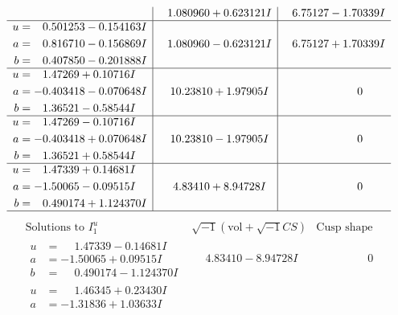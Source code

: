 \documentclass[1p]{elsarticle_modified}
\theoremstyle{definition}
\newcommand{\I}{\sqrt{-1}}
\begin{document}
$$\begin{array}{c|c|c}
 & \phantom{-}1.080960 + 0.623121 I & \phantom{-}6.75127 - 1.70339 I \\ \hline\begin{aligned}
u &= \phantom{-}0.501253 - 0.154163 I \\
a &= \phantom{-}0.816710 - 0.156869 I \\
b &= \phantom{-}0.407850 - 0.201888 I\end{aligned}
 & \phantom{-}1.080960 - 0.623121 I & \phantom{-}6.75127 + 1.70339 I \\ \hline\begin{aligned}
u &= \phantom{-}1.47269 + 0.10716 I \\
a &= -0.403418 - 0.070648 I \\
b &= \phantom{-}1.36521 - 0.58544 I\end{aligned}
 & \phantom{-}10.23810 + 1.97905 I & \phantom{-0.000000 } 0 \\ \hline\begin{aligned}
u &= \phantom{-}1.47269 - 0.10716 I \\
a &= -0.403418 + 0.070648 I \\
b &= \phantom{-}1.36521 + 0.58544 I\end{aligned}
 & \phantom{-}10.23810 - 1.97905 I & \phantom{-0.000000 } 0 \\ \hline\begin{aligned}
u &= \phantom{-}1.47339 + 0.14681 I \\
a &= -1.50065 - 0.09515 I \\
b &= \phantom{-}0.490174 + 1.124370 I\end{aligned}
 & \phantom{-}4.83410 + 8.94728 I & \phantom{-0.000000 } 0\\
 \hline 
 \end{array}$$\newpage$$\begin{array}{c|c|c}  
\text{Solutions to }I^u_{1}& \I (\text{vol} + \sqrt{-1}CS) & \text{Cusp shape}\\
 \hline 
\begin{aligned}
u &= \phantom{-}1.47339 - 0.14681 I \\
a &= -1.50065 + 0.09515 I \\
b &= \phantom{-}0.490174 - 1.124370 I\end{aligned}
 & \phantom{-}4.83410 - 8.94728 I & \phantom{-0.000000 } 0 \\ \hline\begin{aligned}
u &= \phantom{-}1.46345 + 0.23430 I \\
a &= -1.31836 + 1.03633 I \\

\end{aligned}
\end{array}$$
\end{document}
